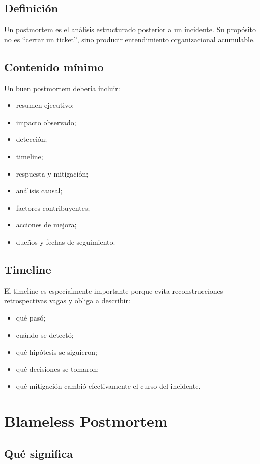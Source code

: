 \documentclass[variant=apuntes,cover=institutional,mode=screen]{ua-engineering-v6-article}
\begin{document}
\subsection{Definición}

Un postmortem es el análisis estructurado posterior a un incidente. Su propósito no es “cerrar un ticket”, sino producir entendimiento organizacional acumulable.

\subsection{Contenido mínimo}

Un buen postmortem debería incluir:

\begin{itemize}
\item resumen ejecutivo;
\item impacto observado;
\item detección;
\item timeline;
\item respuesta y mitigación;
\item análisis causal;
\item factores contribuyentes;
\item acciones de mejora;
\item dueños y fechas de seguimiento.
\end{itemize}

\subsection{Timeline}

El timeline es especialmente importante porque evita reconstrucciones retrospectivas vagas y obliga a describir:
\begin{itemize}
\item qué pasó;
\item cuándo se detectó;
\item qué hipótesis se siguieron;
\item qué decisiones se tomaron;
\item qué mitigación cambió efectivamente el curso del incidente.
\end{itemize}

\section{Blameless Postmortem}

\subsection{Qué significa}
\end{document}
